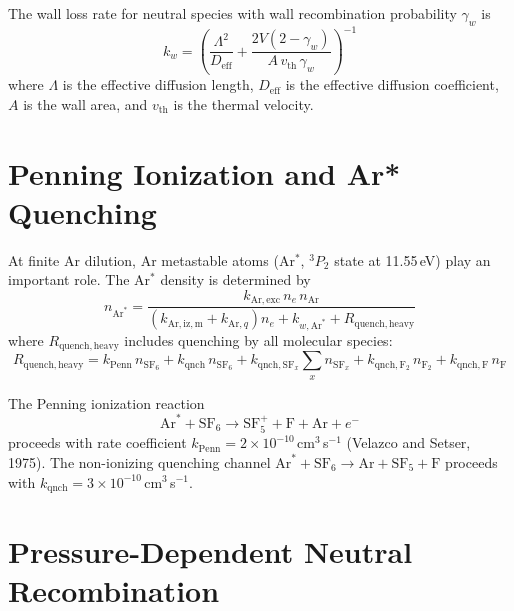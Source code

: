 \documentclass[11pt,a4paper]{article}
\newcommand{\SFx}{\mathrm{SF}_x}
\newcommand{\SFsix}{\mathrm{SF}_6}
\newcommand{\SFfive}{\mathrm{SF}_5}
\newcommand{\Ar}{\mathrm{Ar}}
\newcommand{\ne}{n_e}
\begin{document}
The wall loss rate for neutral species with wall recombination probability $\gamma_w$ is
\begin{equation}
k_w = \left( \frac{\Lambda^2}{D_\mathrm{eff}} + \frac{2V(2-\gamma_w)}{A\, v_\mathrm{th}\, \gamma_w} \right)^{-1}
\end{equation}
where $\Lambda$ is the effective diffusion length, $D_\mathrm{eff}$ is the effective diffusion coefficient, $A$ is the wall area, and $v_\mathrm{th}$ is the thermal velocity.

\section{Penning Ionization and Ar* Quenching}

At finite Ar dilution, Ar metastable atoms (Ar$^*$, ${}^3P_2$ state at 11.55\,eV) play an important role.  The Ar$^*$ density is determined by
\begin{equation}
n_{\Ar^*} = \frac{k_{\Ar,\mathrm{exc}}\, \ne\, n_\Ar}{(k_{\Ar,\mathrm{iz,m}} + k_{\Ar,q})\ne + k_{w,\Ar^*} + R_\mathrm{quench,heavy}}
\end{equation}
where $R_\mathrm{quench,heavy}$ includes quenching by all molecular species:
\begin{equation}
R_\mathrm{quench,heavy} = k_\mathrm{Penn}\, n_{\SFsix} + k_\mathrm{qnch}\, n_{\SFsix} + k_{\mathrm{qnch},\SFx} \sum_x n_{\SFx} + k_{\mathrm{qnch},\mathrm{F}_2}\, n_{\mathrm{F}_2} + k_{\mathrm{qnch},\mathrm{F}}\, n_\mathrm{F}
\end{equation}

The Penning ionization reaction
\begin{equation}
\Ar^* + \SFsix \to \SFfive^+ + \mathrm{F} + \Ar + e^-
\end{equation}
proceeds with rate coefficient $k_\mathrm{Penn} = 2 \times 10^{-10}$\,cm$^3$\,s$^{-1}$ (Velazco and Setser, 1975).  The non-ionizing quenching channel $\Ar^* + \SFsix \to \Ar + \SFfive + \mathrm{F}$ proceeds with $k_\mathrm{qnch} = 3 \times 10^{-10}$\,cm$^3$\,s$^{-1}$.

\section{Pressure-Dependent Neutral Recombination}
\label{sec:troe}
\end{document}

